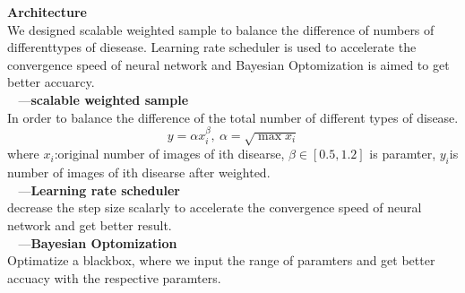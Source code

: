 \documentclass[25pt, a0paper, landscape]{tikzposter}
\begin{document}
\begin{columns}
{ 
     
    \textbullet \textbf{Architecture}\\
     We designed scalable weighted sample to balance the difference of numbers of differenttypes of diesease. Learning rate scheduler is used to accelerate the convergence speed of neural network and Bayesian Optomization is aimed to get better accuarcy.\\
    $~~~~$---\textbf{scalable weighted sample}\\
    In order to balance the difference of the total number of different types of disease.
    $$y=\alpha x_{i}^\beta, \ \alpha = \sqrt{{\max{x_{i}}}}$$
    where 
    $x_{i}$:original number of images of ith disearse, $\beta \in [0.5, 1.2]$ is paramter, $y_{i}$is number of images of ith disearse after weighted.\\
    
    $~~~~$---\textbf{Learning rate scheduler}\\
    decrease the step size scalarly to accelerate the convergence speed of neural network and get better result.\\
    $~~~~$---\textbf{Bayesian Optomization}\\
    Optimatize a blackbox, where we input the range of paramters and get better accuacy with the respective paramters.
    
    }
    
  

\end{columns}
\end{document}
